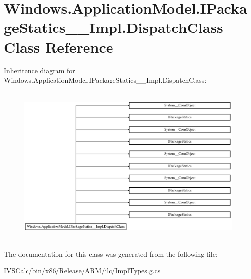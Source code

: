 \hypertarget{class_windows_1_1_application_model_1_1_i_package_statics_____impl_1_1_dispatch_class}{}\section{Windows.\+Application\+Model.\+I\+Package\+Statics\+\_\+\+\_\+\+Impl.\+Dispatch\+Class Class Reference}
\label{class_windows_1_1_application_model_1_1_i_package_statics_____impl_1_1_dispatch_class}
Inheritance diagram for Windows.\+Application\+Model.\+I\+Package\+Statics\+\_\+\+\_\+\+Impl.\+Dispatch\+Class\+:\begin{figure}[H]
\begin{center}
\leavevmode
\includegraphics[height=8.000000cm]{class_windows_1_1_application_model_1_1_i_package_statics_____impl_1_1_dispatch_class}
\end{center}
\end{figure}


The documentation for this class was generated from the following file\+:\begin{DoxyCompactItemize}
\item 
I\+V\+S\+Calc/bin/x86/\+Release/\+A\+R\+M/ilc/Impl\+Types.\+g.\+cs\end{DoxyCompactItemize}
